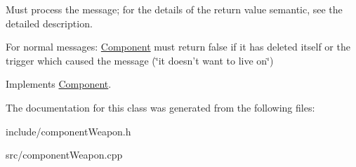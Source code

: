 \-Must process the message; for the details of the return value semantic, see the detailed description. 

\-For normal messages\-: \hyperlink{classComponent}{\-Component} must return false if it has deleted itself or the trigger which caused the message (\char`\"{}it doesn't want to live on\char`\"{}) 

\-Implements \hyperlink{classComponent_a5c34b629ba4b6e2925045ef965d4d560}{\-Component}.



\-The documentation for this class was generated from the following files\-:\begin{DoxyCompactItemize}
\item 
include/component\-Weapon.\-h\item 
src/component\-Weapon.\-cpp\end{DoxyCompactItemize}
